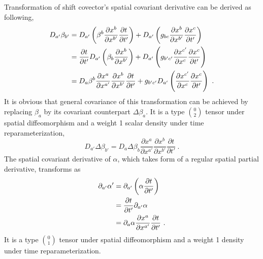 Transformation of shift covector's spatial covariant derivative can be derived as following, 
\begin{align}\label{shiftvectorcovariantspatialderivativetransform}
D_{a'}\beta_{b'} &= D_{a'}\left(\beta^{b}\frac{\partial x^{b}}{\partial x^{b'}}\frac{\partial t}{\partial t'}\right) + D_{a'}\left(g_{bc}\frac{\partial x^{b}}{\partial x^{b'}}\frac{\partial x^{c}}{\partial t'}\right)\notag\\
& = \frac{\partial t}{\partial t'}D_{a'}\left(\beta_{b}\frac{\partial x^{b}}{\partial x^{b'}}\right) + D_{a'}\left(g_{b'c'}\frac{\partial x^{c'}}{\partial x^{c}}\frac{\partial x^{c}}{\partial t'}\right)\notag\\
& = D_{a}\beta^{b}\frac{\partial x^{a}}{\partial x^{a'}}\frac{\partial x^{b}}{\partial x^{b'}}\frac{\partial t}{\partial t'} + g_{b'c'}D_{a'}\left(\frac{\partial x^{c'}}{\partial x^{c}}\frac{\partial x^{c}}{\partial t'}\right) \ .
\end{align} 
It is obvious that general covariance of this transformation can be achieved by replacing $\beta_{a}$ by its covariant counterpart $\Delta \beta_{a}$. It is a type $0 \choose 2$ tensor under spatial diffeomorphism and a weight 1 scalar density under time reparameterization, 
\begin{equation}\label{covariantshiftvectorcovariantspatialderivativetransform}
	D_{a'}\Delta\beta_{b'} = D_{a}\Delta\beta_{b}\frac{\partial x^{a}}{\partial x^{a'}}\frac{\partial x^{b}}{\partial x^{b'}}\frac{\partial t}{\partial t'} \ .
\end{equation}	
The spatial covariant derivative of $\alpha$, which takes form of a regular spatial partial derivative, transforms as 
\begin{align}\label{lapsefunctionspatialderivative}
\partial_{a'}\alpha' & = \partial_{a'}\left(\alpha \frac{\partial t}{\partial t'}\right) \notag \\
& = \frac{\partial t}{\partial t'}\partial_{a'}\alpha \notag \\
& = \partial_{a}\alpha\frac{\partial x^{a}}{\partial x^{a'}}\frac{\partial t}{\partial t'} \ .
\end{align}
It is a type $0 \choose 1$ tensor under spatial diffeomorphism and a weight 1 density under time reparameterization.

